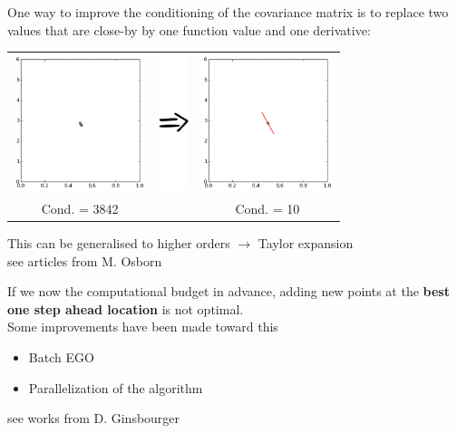 \documentclass{beamer}
\begin{document}
\begin{frame}{}
One way to improve the conditioning of the covariance matrix is to replace two values that are close-by by one function value and one derivative:
\begin{center}
  \begin{tabular}{ccc}
\includegraphics[height=4cm]{figures/python/osborn0} &
\includegraphics[height=4cm]{figures/Rightarrow} &
\includegraphics[height=4cm]{figures/python/osborn1} \\
Cond. = 3842 & & Cond. = 10
  \end{tabular}
\end{center}
This can be generalised to higher orders \alert{$\rightarrow$} Taylor expansion\\
\small see articles from M. Osborn
\end{frame}

\begin{frame}{}
If we now the computational budget in advance, adding new points at the \textbf{best one step ahead location} is not optimal.\\
\vspace{5mm}
Some improvements have been made toward this
\begin{itemize}
	\item Batch EGO
	\item Parallelization of the algorithm
\end{itemize}
\vspace{5mm}
\small see works from D. Ginsbourger
\end{frame}
\end{document}
